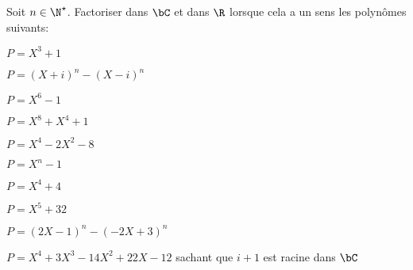 \documentclass[a4paper, 11pt,reqno]{article}
\begin{document}
\begin{exercice}  \;
	Soit $n\in\N^{\star}$. Factoriser dans $\bC$ et dans $\R$ lorsque cela a un sens les polyn\^omes suivants:
	\begin{enumerate}
		\begin{minipage}[t]{0.35\textwidth}
			\item $P=X^3+1$
			\item $P=(X+i)^n-(X-i)^n$
			\item $P=X^6-1$
			\item $P=X^8+X^4+1$
			\item $P=X^4-2X^2-8$
		\end{minipage}
		\quad
		\begin{minipage}[t]{0.55\textwidth}
			\item $P=X^n-1$
			\item $P=X^4+4$
			\item $P=X^5+32$
			\item $P=(2X-1)^n-(-2X+3)^n$
			\item $P=X^4+3X^3-14X^2+22X-12$ sachant que $i+1$ est racine dans $\bC$
		\end{minipage}
	\end{enumerate}
\end{exercice}
\end{document}
